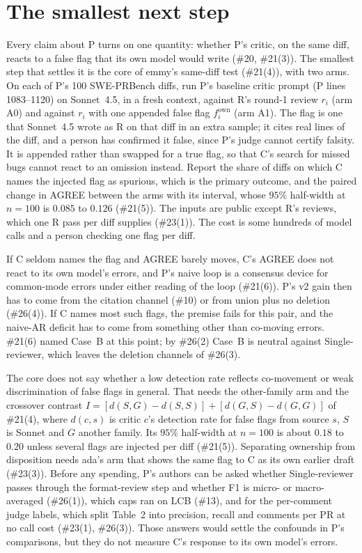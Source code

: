 \documentclass{article}
\begin{document}
\section{The smallest next step}\label{sec:next}

Every claim about P turns on one quantity: whether P's critic, on the
same diff, reacts to a false flag that its own model would write (\#20,
\#21(3)). The smallest step that settles it is the core of emmy's
same-diff test (\#21(4)), with two arms. On each of P's 100 SWE-PRBench
diffs, run P's baseline critic prompt (P lines 1083--1120) on Sonnet~4.5,
in a fresh context, against R's round-1 review $r_i$ (arm A0) and against
$r_i$ with one appended false flag $f_i^{\mathrm{own}}$ (arm A1). The flag
is one that Sonnet~4.5 wrote as R on that diff in an extra sample; it
cites real lines of the diff, and a person has confirmed it false, since
P's judge cannot certify falsity. It is appended rather than swapped for
a true flag, so that C's search for missed bugs cannot react to an
omission instead. Report the share of diffs on which C names the injected
flag as spurious, which is the primary outcome, and the paired change in
AGREE between the arms with its interval, whose $95\%$ half-width at
$n=100$ is $0.085$ to $0.126$ (\#21(5)). The inputs are public except R's
reviews, which one R pass per diff supplies (\#23(1)). The cost is some
hundreds of model calls and a person checking one flag per diff.

If C seldom names the flag and AGREE barely moves, C's AGREE does not
react to its own model's errors, and P's naive loop is a consensus device
for common-mode errors under either reading of the loop (\#21(6)). P's v2
gain then has to come from the citation channel (\#10) or from union plus
no deletion (\#26(4)). If C names most such flags, the premise fails for
this pair, and the naive-AR deficit has to come from something other than
co-moving errors. \#21(6) named Case~B at this point; by \#26(2) Case~B is
neutral against Single-reviewer, which leaves the deletion channels of
\#26(3).

The core does not say whether a low detection rate reflects co-movement
or weak discrimination of false flags in general. That needs the
other-family arm and the crossover contrast
$I=[d(S,G)-d(S,S)]+[d(G,S)-d(G,G)]$ of \#21(4), where $d(c,s)$ is critic
$c$'s detection rate for false flags from source $s$, $S$ is Sonnet and
$G$ another family. Its $95\%$ half-width at $n=100$ is about $0.18$ to
$0.20$ unless several flags are injected per diff (\#21(5)). Separating
ownership from disposition needs ada's arm that shows the same flag to C
as its own earlier draft (\#23(3)). Before any spending, P's authors can
be asked whether Single-reviewer passes through the format-review step
and whether F1 is micro- or macro-averaged (\#26(1)), which caps ran on
LCB (\#13), and for the per-comment judge labels, which split Table~2 into
precision, recall and comments per PR at no call cost (\#23(1), \#26(3)).
Those answers would settle the confounds in P's comparisons, but they do
not measure C's response to its own model's errors.
\end{document}
